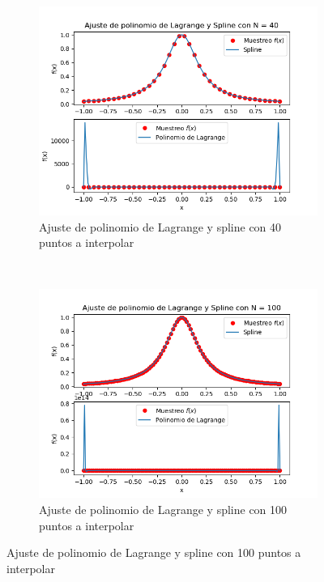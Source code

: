 \documentclass[10pt,a4paper]{article}
\begin{document}
\begin{figure}[h]
\begin{subfigure}[h]{0.4\textwidth}
    \end{subfigure}
    \begin{subfigure}[h]{0.4\textwidth}
        \includegraphics[width=\textwidth]{ajuste40.png}
        \caption{Ajuste de polinomio de Lagrange y spline con 40 puntos a interpolar}
    \end{subfigure}
    ~ %
    \begin{subfigure}[h]{0.4\textwidth}
        \includegraphics[width=\textwidth]{ajuste100.png}
        \caption{Ajuste de polinomio de Lagrange y spline con 100 puntos a interpolar}
        \label{fig100}
    \end{subfigure}
\end{figure}
\end{document}
